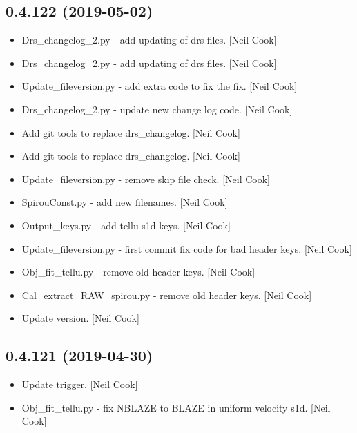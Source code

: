 \documentclass[a4paper,10pt,english]{report}
\begin{document}
\subsection{0.4.122 (2019-05-02)}
\label{\detokenize{misc/changelog:id137}}\begin{itemize}
\item {} 
Drs\_changelog\_2.py - add updating of drs files. {[}Neil Cook{]}

\item {} 
Drs\_changelog\_2.py - add updating of drs files. {[}Neil Cook{]}

\item {} 
Update\_fileversion.py - add extra code to fix the fix. {[}Neil Cook{]}

\item {} 
Drs\_changelog\_2.py - update new change log code. {[}Neil Cook{]}

\item {} 
Add git tools to replace drs\_changelog. {[}Neil Cook{]}

\item {} 
Add git tools to replace drs\_changelog. {[}Neil Cook{]}

\item {} 
Update\_fileversion.py - remove skip file check. {[}Neil Cook{]}

\item {} 
SpirouConst.py - add new filenames. {[}Neil Cook{]}

\item {} 
Output\_keys.py - add tellu s1d keys. {[}Neil Cook{]}

\item {} 
Update\_fileversion.py - first commit fix code for bad header keys.
{[}Neil Cook{]}

\item {} 
Obj\_fit\_tellu.py - remove old header keys. {[}Neil Cook{]}

\item {} 
Cal\_extract\_RAW\_spirou.py - remove old header keys. {[}Neil Cook{]}

\item {} 
Update version. {[}Neil Cook{]}

\end{itemize}


\subsection{0.4.121 (2019-04-30)}
\label{\detokenize{misc/changelog:id138}}\begin{itemize}
\item {} 
Update trigger. {[}Neil Cook{]}

\item {} 
Obj\_fit\_tellu.py - fix NBLAZE to BLAZE in uniform velocity s1d. {[}Neil
Cook{]}

\end{itemize}
\end{document}
